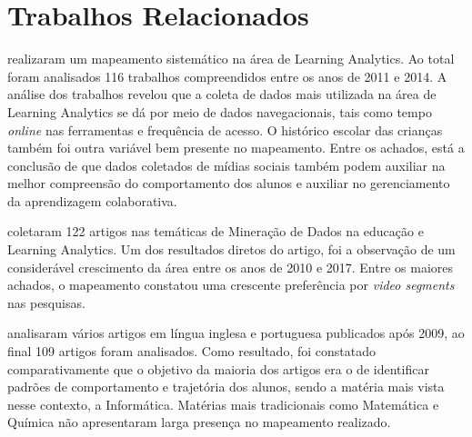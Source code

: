\documentclass[12pt]{article}
\begin{document}
\vspace{-0.1cm}

\section{Trabalhos Relacionados}\label{secao:trabalhos}

 realizaram um mapeamento sistemático na área de Learning Analytics. Ao total foram analisados 116 trabalhos compreendidos entre os anos de 2011 e 2014. %
A análise dos trabalhos revelou que a coleta de dados mais utilizada na área de Learning Analytics se dá por meio de dados navegacionais, tais como tempo \textit{online} nas ferramentas e frequência de acesso. O histórico escolar das crianças também foi outra variável bem presente no mapeamento. %
Entre os achados, está a conclusão de que dados coletados de mídias sociais também podem auxiliar na melhor compreensão do comportamento dos alunos e auxiliar no gerenciamento da aprendizagem colaborativa.

\vspace{-0.1cm}

 coletaram  122 artigos nas temáticas de Mineração de Dados na educação e Learning Analytics. %
Um dos resultados diretos do artigo, foi a observação de um considerável crescimento da área entre os anos de 2010 e 2017. Entre os maiores achados, o mapeamento constatou uma crescente preferência por \textit{video segments} nas pesquisas. %

\vspace{-0.1cm}

 analisaram vários artigos em língua inglesa e portuguesa publicados após 2009, ao final 109 artigos foram analisados. %
Como resultado, foi constatado comparativamente que o objetivo da maioria dos artigos era o de identificar padrões de comportamento e trajetória dos alunos, sendo a matéria mais vista nesse contexto, a Informática. Matérias mais tradicionais como Matemática e Química não apresentaram larga presença no mapeamento realizado.
\end{document}
